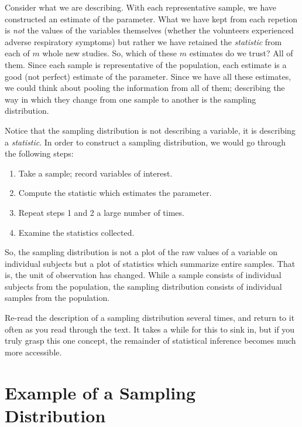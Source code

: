 \documentclass[]{book}
\providecommand{\tightlist}{%
  \setlength{\itemsep}{0pt}\setlength{\parskip}{0pt}}
\theoremstyle{definition}
\theoremstyle{definition}
\theoremstyle{remark}
\let\BeginKnitrBlock\begin \let\EndKnitrBlock\end
\begin{document}
Consider what we are describing. With each representative sample, we
have constructed an estimate of the parameter. What we have kept from
each repetion is \emph{not} the values of the variables themselves
(whether the volunteers experienced adverse respiratory symptoms) but
rather we have retained the \emph{statistic} from each of \(m\) whole
new studies. So, which of these \(m\) estimates do we trust? All of
them. Since each sample is representative of the population, each
estimate is a good (not perfect) estimate of the parameter. Since we
have all these estimates, we could think about pooling the information
from all of them; describing the way in which they change from one
sample to another is the sampling distribution.

Notice that the sampling distribution is not describing a variable, it
is describing a \emph{statistic}. In order to construct a sampling
distribution, we would go through the following steps:

\begin{enumerate}
\def\labelenumi{\arabic{enumi}.}
\tightlist
\item
  Take a sample; record variables of interest.
\item
  Compute the statistic which estimates the parameter.
\item
  Repeat steps 1 and 2 a large number of times.
\item
  Examine the statistics collected.
\end{enumerate}

So, the sampling distribution is not a plot of the raw values of a
variable on individual subjects but a plot of statistics which summarize
entire samples. That is, the unit of observation has changed. While a
sample consists of individual subjects from the population, the sampling
distribution consists of individual samples from the population.

\BeginKnitrBlock{rmdtip}
Re-read the description of a sampling distribution several times, and
return to it often as you read through the text. It takes a while for
this to sink in, but if you truly grasp this one concept, the remainder
of statistical inference becomes much more accessible.
\EndKnitrBlock{rmdtip}

\section{Example of a Sampling
Distribution}\label{example-of-a-sampling-distribution}
\end{document}
